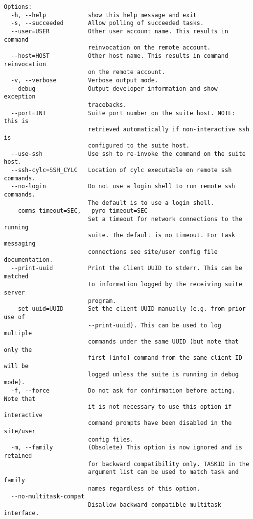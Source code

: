 \begin{lstlisting}
Options:
  -h, --help            show this help message and exit
  -s, --succeeded       Allow polling of succeeded tasks.
  --user=USER           Other user account name. This results in command
                        reinvocation on the remote account.
  --host=HOST           Other host name. This results in command reinvocation
                        on the remote account.
  -v, --verbose         Verbose output mode.
  --debug               Output developer information and show exception
                        tracebacks.
  --port=INT            Suite port number on the suite host. NOTE: this is
                        retrieved automatically if non-interactive ssh is
                        configured to the suite host.
  --use-ssh             Use ssh to re-invoke the command on the suite host.
  --ssh-cylc=SSH_CYLC   Location of cylc executable on remote ssh commands.
  --no-login            Do not use a login shell to run remote ssh commands.
                        The default is to use a login shell.
  --comms-timeout=SEC, --pyro-timeout=SEC
                        Set a timeout for network connections to the running
                        suite. The default is no timeout. For task messaging
                        connections see site/user config file documentation.
  --print-uuid          Print the client UUID to stderr. This can be matched
                        to information logged by the receiving suite server
                        program.
  --set-uuid=UUID       Set the client UUID manually (e.g. from prior use of
                        --print-uuid). This can be used to log multiple
                        commands under the same UUID (but note that only the
                        first [info] command from the same client ID will be
                        logged unless the suite is running in debug mode).
  -f, --force           Do not ask for confirmation before acting. Note that
                        it is not necessary to use this option if interactive
                        command prompts have been disabled in the site/user
                        config files.
  -m, --family          (Obsolete) This option is now ignored and is retained
                        for backward compatibility only. TASKID in the
                        argument list can be used to match task and family
                        names regardless of this option.
  --no-multitask-compat
                        Disallow backward compatible multitask interface.
\end{lstlisting}
